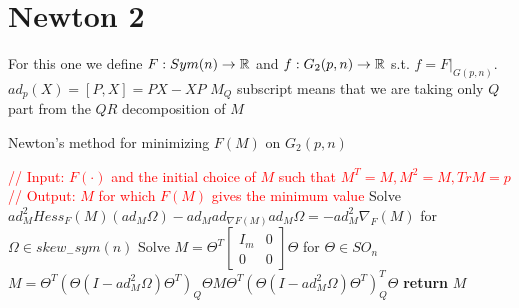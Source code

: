 \documentclass[11pt,a4paper]{report}
\begin{document}
\section{Newton 2}
For this one we define $F: Sym(n) \to \mathbb{R} $ and  $f: G_2(p,n) \to \mathbb{R}$ s.t. $f= F|_{G(p,n)}. \quad$
$ ad_p(X) = [P, X] = PX -  XP $
$M_Q$ subscript means that we are taking only $Q$ part from the $QR$ decomposition of $M$
\begin{algorithm}\label{newton2}
\caption{Newton's method for minimizing $F(M)$ on $G_2(p,n)$ }\label{alg:projAlg}
    \begin{algorithmic}[1]
        \State \textcolor{red}{// Input: $F(\cdot)$ and the initial choice of $M$ such that $M^T=M, M^2=M, TrM=p$}
        \State \textcolor{red}{// Output: $M$ for which $F(M)$ gives the minimum value}
        \State Solve
        \State $ad^2_{M} Hess_{F}(M)(ad_{M}\Omega) - ad_{M} ad_{\nabla F (M) } ad_{M} \Omega = -ad^2_{M} \nabla_{F}(M)$
        \State for $\Omega \in skew_-sym(n) $
        \State
        \State Solve 
        \State $M = \Theta^T \begin{bmatrix} I_m & 0 \\ 0 & 0 \end{bmatrix} \Theta$ 
        \State for $ \Theta \in SO_n$
        \State
        \State $ M = \Theta^T (\Theta( I - ad^2_{M} \Omega ) \Theta^T)_Q     \Theta M \Theta^T    (\Theta (I - ad^2_{M} \Omega) \Theta^T)_Q^T    \Theta$
        \EndWhile
        \State \textbf{return} $M$
        \EndProcedure
    \end{algorithmic}
\end{algorithm}
\end{document}
